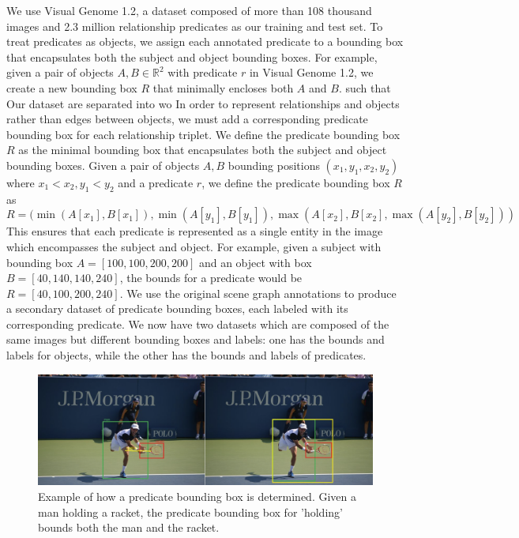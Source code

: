 \documentclass{article}
\begin{document}
We use Visual Genome 1.2, a dataset composed of more than 108 thousand images and 2.3 million relationship predicates \cite{krishna2017visual} as our training and test set. To treat predicates as objects, we assign each annotated predicate to a bounding box that encapsulates both the subject and object bounding boxes. For example, given a pair of objects $A,B \in \mathbb{R}^2$ with predicate $r$ in Visual Genome 1.2, we create a new bounding box $R$ that minimally encloses both $A$ and $B$. such that 
Our dataset are separated into wo
In order to represent relationships and objects rather than edges between objects, we must add a corresponding predicate bounding box for each relationship triplet. We define the predicate bounding box $R$ as the minimal bounding box that encapsulates both the subject and object bounding boxes. Given a pair of objects $A,B$ bounding positions $(x_1,y_1,x_2,y_2)$ where $x_1 < x_2, y_1 < y_2$ and a predicate $r$, we define the predicate bounding box $R$ as
$$
R = (\min(A[x_1],B[x_1]),\min(A[y_1],B[y_1]), \max(A[x_2],B[x_2], \max(A[y_2],B[y_2]))
$$
This ensures that each predicate is represented as a single entity in the image which encompasses the subject and object. For example, given a subject with bounding box $A=[100,100,200,200]$ and an object with box $B=[40,140,140,240]$, the bounds for a predicate would be $R=[40,100,200,240]$. We use the original scene graph annotations to produce a secondary dataset of predicate bounding boxes, each labeled with its corresponding predicate. We now have two datasets which are composed of the same images but different bounding boxes and labels: one has the bounds and labels for objects, while the other has the bounds and labels of predicates. 

\begin{figure}
    \includegraphics[width=\textwidth]{figures/figure1.png}
  \centering
  \caption{Example of how a predicate bounding box is determined. Given a man holding a racket, the predicate bounding box for 'holding' bounds both the man and the racket.}
\end{figure}
\end{document}
